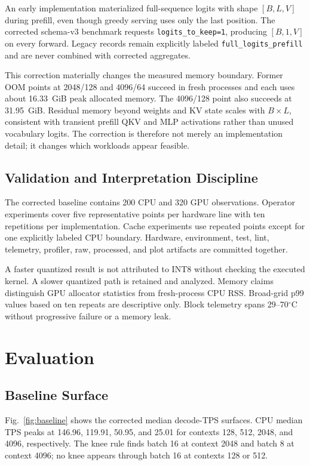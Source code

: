 \documentclass[conference]{IEEEtran}
\begin{document}
An early implementation materialized full-sequence logits with shape
$[B,L,V]$ during prefill, even though greedy serving uses only the last
position. The corrected schema-v3 benchmark requests
\texttt{logits\_to\_keep=1}, producing $[B,1,V]$ on every forward. Legacy
records remain explicitly labeled \texttt{full\_logits\_prefill} and are
never combined with corrected aggregates.

This correction materially changes the measured memory boundary. Former OOM
points at 2048/128 and 4096/64 succeed in fresh processes and each uses about
16.33~GiB peak allocated memory. The 4096/128 point also succeeds at
31.95~GiB. Residual memory beyond weights and KV state scales with
$B\times L$, consistent with transient prefill QKV and MLP activations rather
than unused vocabulary logits. The correction is therefore not merely an
implementation detail; it changes which workloads appear feasible.

\subsection{Validation and Interpretation Discipline}

The corrected baseline contains 200 CPU and 320 GPU observations. Operator
experiments cover five representative points per hardware line with ten
repetitions per implementation. Cache experiments use repeated points except
for one explicitly labeled CPU boundary. Hardware, environment, test, lint,
telemetry, profiler, raw, processed, and plot artifacts are committed
together.

A faster quantized result is not attributed to INT8 without checking the
executed kernel. A slower quantized path is retained and analyzed. Memory
claims distinguish GPU allocator statistics from fresh-process CPU RSS.
Broad-grid p99 values based on ten repeats are descriptive only. Block
telemetry spans 29--70$^\circ$C without progressive failure or a memory leak.

\section{Evaluation}

\subsection{Baseline Surface}

Fig.~\ref{fig:baseline} shows the corrected median decode-TPS surfaces. CPU
median TPS peaks at 146.96, 119.91, 50.95, and 25.01 for contexts 128, 512,
2048, and 4096, respectively. The knee rule finds batch 16 at context 2048
and batch 8 at context 4096; no knee appears through batch 16 at contexts 128
or 512.
\end{document}
